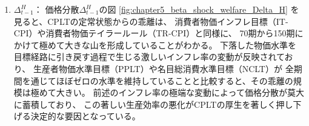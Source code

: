 \begin{enumerate}
        この全期間を通じたインフレ率の極端かつ不安定な変動が、次項で述べる価格分散の莫大な蓄積をもたらし、
        結果として厚生を著しく悪化させる要因となっている。
    \item
    \label{itm:chapter5_beta_shock_policies_cplt_Delta_t_minus_1_H}
        \(\Delta_{t-1}^H\)：
        価格分散\(\Delta_{t-1}^H\)の図
        \ref{fig:chapter5_beta_shock_welfare_Delta_H}
        を見ると、CPLTの定常状態からの乖離は、
        消費者物価インフレ目標（IT-CPI）や消費者物価テイラールール（TR-CPI）と同様に、
        70期から150期にかけて極めて大きな山を形成していることがわかる。
        下落した物価水準を目標経路に引き戻す過程で生じる激しいインフレ率の変動が反映されており、
        生産者物価水準目標（PPLT）や名目総消費水準目標（NCLT）が
        全期間を通じてほぼゼロの水準を維持していることと比較すると、その乖離の規模は極めて大きい。
        前述のインフレ率の極端な変動によって価格分散が莫大に蓄積しており、
        この著しい生産効率の悪化がCPLTの厚生を著しく押し下げる決定的な要因となっている。
\end{enumerate}